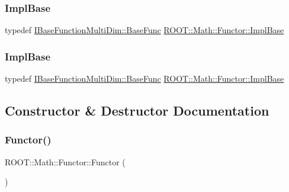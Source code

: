 \mbox{\label{classROOT_1_1Math_1_1Functor_acc5dacb213f26296122e95138f5153b3}} 
\subsubsection{\texorpdfstring{ImplBase}{ImplBase}\hspace{0.1cm}{\footnotesize\ttfamily [2/3]}}
{\footnotesize\ttfamily typedef \mbox{\hyperlink{classROOT_1_1Math_1_1IBaseFunctionMultiDim_a44c87c3e8c23d140cc3bf067d6480070}{I\+Base\+Function\+Multi\+Dim\+::\+Base\+Func}} \mbox{\hyperlink{classROOT_1_1Math_1_1Functor_acc5dacb213f26296122e95138f5153b3}{R\+O\+O\+T\+::\+Math\+::\+Functor\+::\+Impl\+Base}}}

\mbox{\label{classROOT_1_1Math_1_1Functor_acc5dacb213f26296122e95138f5153b3}} 
\subsubsection{\texorpdfstring{ImplBase}{ImplBase}\hspace{0.1cm}{\footnotesize\ttfamily [3/3]}}
{\footnotesize\ttfamily typedef \mbox{\hyperlink{classROOT_1_1Math_1_1IBaseFunctionMultiDim_a44c87c3e8c23d140cc3bf067d6480070}{I\+Base\+Function\+Multi\+Dim\+::\+Base\+Func}} \mbox{\hyperlink{classROOT_1_1Math_1_1Functor_acc5dacb213f26296122e95138f5153b3}{R\+O\+O\+T\+::\+Math\+::\+Functor\+::\+Impl\+Base}}}



\subsection{Constructor \& Destructor Documentation}
\mbox{\label{classROOT_1_1Math_1_1Functor_a2330648eca94b53b3ba613e49d03927f}} 
\subsubsection{\texorpdfstring{Functor()}{Functor()}\hspace{0.1cm}{\footnotesize\ttfamily [1/12]}}
{\footnotesize\ttfamily R\+O\+O\+T\+::\+Math\+::\+Functor\+::\+Functor (\begin{DoxyParamCaption}{ }\end{DoxyParamCaption})\hspace{0.3cm}{\ttfamily [inline]}}

